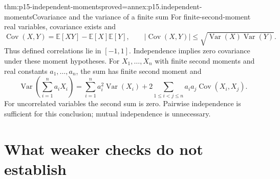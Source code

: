 \begin{hbtheorem}{thm:p15-independent-moments}{proved=annex:p15.independent-moments}{Covariance and the variance of a finite sum}
For finite-second-moment real variables, covariance exists and
\[
 \operatorname{Cov}(X,Y)=\mathbb E[XY]-\mathbb E[X]\mathbb E[Y],
 \qquad
 |\operatorname{Cov}(X,Y)|
       \leq\sqrt{\operatorname{Var}(X)\operatorname{Var}(Y)}.
\]
Thus defined correlations lie in \([-1,1]\). Independence implies
zero covariance under these moment hypotheses.
For \(X_1,\ldots,X_n\) with finite second moments and real constants
\(a_1,\ldots,a_n\), the sum has finite second moment and
\[
 \operatorname{Var}\left(\sum_{i=1}^n a_iX_i\right)
  =\sum_{i=1}^n a_i^2\operatorname{Var}(X_i)
      +2\sum_{1\leq i<j\leq n}a_ia_j\operatorname{Cov}(X_i,X_j).
\]
For uncorrelated variables the second sum is zero. Pairwise independence
is sufficient for this conclusion; mutual independence is unnecessary.
\end{hbtheorem}

\section{What weaker checks do not establish}
\label{sec:p15-independence-boundaries}

